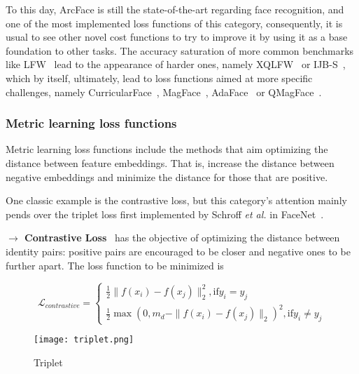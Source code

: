 \documentclass[class=report, crop=false, a4paper, 12pt]{standalone}
\begin{document}
\vspace{\baselineskip}
To this day, ArcFace is still the state-of-the-art regarding face recognition, and one of the most implemented loss functions of this category, consequently, it is usual to see other novel cost functions to try to improve it by using it as a base foundation to other tasks. The accuracy saturation of more common benchmarks like LFW~\autocite{huangLabeledFacesWild} lead to the appearance of harder ones, namely XQLFW~\autocite{knocheCrossQualityLFWDatabase2021} or IJB-S~\autocite{kalkaIJBIARPAJanus2018}, which by itself, ultimately, lead to loss functions aimed at more specific challenges, namely CurricularFace~\autocite{huangCurricularFaceAdaptiveCurriculum2020}, MagFace~\autocite{mengMagFaceUniversalRepresentation2021}, AdaFace~\autocite{kimAdaFaceQualityAdaptive2022} or QMagFace~\autocite{terhorstQMagFaceSimpleAccurate2023}.

\subsubsection{Metric learning loss functions}
Metric learning loss functions include the methods that aim optimizing the distance between feature embeddings. That is, increase the distance between negative embeddings and minimize the distance for those that are positive.
\par One classic example is the contrastive loss, but this category's attention mainly pends over the triplet loss first implemented by Schroff \textit{et al.} in FaceNet~\autocite{schroffFaceNetUnifiedEmbedding2015}. 

\vspace{0.7\baselineskip}
\noindent\textbf{$\rightarrow$ Contrastive Loss}~\autocite{duElementsEndtoendDeep2022} has the objective of optimizing the distance between identity pairs: positive pairs are encouraged to be closer and negative ones to be further apart. The loss function to be minimized is

\begin{equation}
    \mathcal{L}_{contrastive} = 
    \begin{cases}
      \frac{1}{2}\|f(x_i)-f(x_j)\|^{2}_{2}, \text{if} y_i=y_j\\
      \frac{1}{2}\max{(0, m_d-\|f(x_i)-f(x_j)\|_2)^2}, \text{if} y_i\neq y_j
    \end{cases}
\end{equation}

\begin{figure}[!h]
    \centering
    \texttt{[image: triplet.png]}
    \caption{Triplet}
    \label{fig:triplet}
\end{figure}
\end{document}
